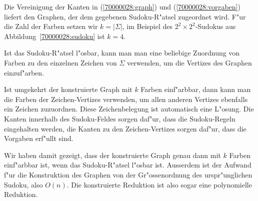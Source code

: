 \begin{loesung}
Die Vereinigung der Kanten in (\ref{70000028:graph}) und
(\ref{70000028:vorgaben}) liefert den Graphen, der dem gegebenen
Sudoku-R"atsel zugeordnet wird.
F"ur die Zahl der Farben setzen wir $k=|\Sigma|$, im Beispiel des
$2^2\times 2^2$-Sudokus aus Abbildung~\ref{70000028:sudoku} ist $k=4$.

Ist das Sudoku-R"atsel l"osbar, kann man man eine beliebige
Zuordnung von Farben zu den einzelnen Zeichen von $\Sigma$ verwenden,
um die Vertizes des Graphen einzuf"arben. 

Ist umgekehrt der konstruierte Graph mit $k$ Farben einf"arbbar, dann kann man
die Farben der Zeichen-Vertizes verwenden, um allen anderen Vertizes
ebenfalls ein Zeichen zuzuordnen. Diese Zeichenbelegung ist automatisch
eine L"osung. Die Kanten innerhalb des Sudoku-Feldes sorgen daf"ur, dass
die Sudoku-Regeln eingehalten werden, die Kanten zu den Zeichen-Vertizes
sorgen daf"ur, dass die Vorgaben erf"ullt sind.

Wir haben damit gezeigt, dass der konstruierte Graph genau dann mit
$k$ Farben einf"arbbar ist, wenn das Sudoku-R"atsel l"osbar ist. 
Ausserdem ist der Aufwand f"ur die Konstruktion des Graphen von der
Gr"ossenordnung des urspr"unglichen Sudoku, also $O(n)$. Die konstruierte
Reduktion ist also sogar eine polynomielle Reduktion.
\end{loesung}


